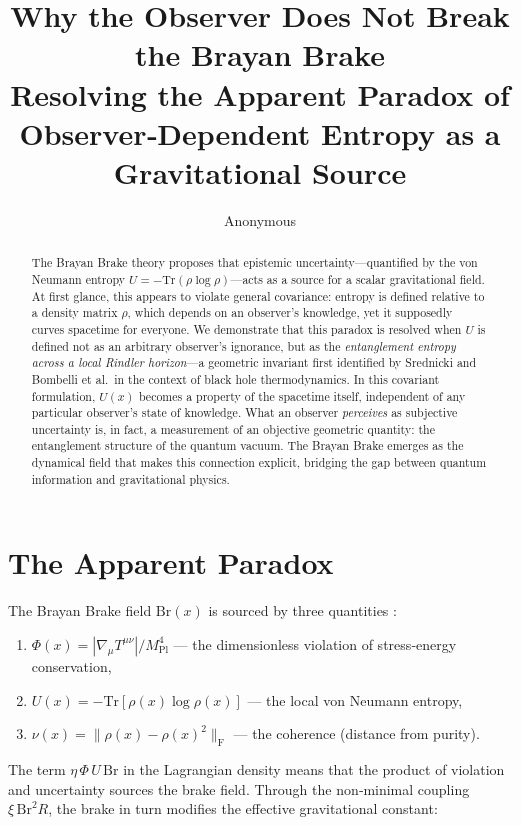 \documentclass[11pt]{article}
\title{\textbf{Why the Observer Does Not Break the Brayan Brake}\\[4pt]
\small Resolving the Apparent Paradox of Observer‑Dependent Entropy as a Gravitational Source}
\author{Anonymous}
\date{}
\begin{document}
\maketitle

\begin{abstract}
The Brayan Brake theory proposes that epistemic uncertainty—quantified by the von Neumann entropy \(U = -\mathrm{Tr}(\rho\log\rho)\)—acts as a source for a scalar gravitational field. At first glance, this appears to violate general covariance: entropy is defined relative to a density matrix \(\rho\), which depends on an observer's knowledge, yet it supposedly curves spacetime for everyone. We demonstrate that this paradox is resolved when \(U\) is defined not as an arbitrary observer's ignorance, but as the \emph{entanglement entropy across a local Rindler horizon}—a geometric invariant first identified by Srednicki and Bombelli et al.\ in the context of black hole thermodynamics. In this covariant formulation, \(U(x)\) becomes a property of the spacetime itself, independent of any particular observer's state of knowledge. What an observer \emph{perceives} as subjective uncertainty is, in fact, a measurement of an objective geometric quantity: the entanglement structure of the quantum vacuum. The Brayan Brake emerges as the dynamical field that makes this connection explicit, bridging the gap between quantum information and gravitational physics.
\end{abstract}

\section{The Apparent Paradox}
\label{sec:paradox}

The Brayan Brake field \(\mathrm{Br}(x)\) is sourced by three quantities \cite{brayan_brake_initial}:

\begin{enumerate}[leftmargin=2em]
    \item \(\Phi(x) = |\nabla_\mu T^{\mu\nu}| / M_{\text{Pl}}^4\) — the dimensionless violation of stress‑energy conservation,
    \item \(U(x) = -\mathrm{Tr}[\rho(x)\log\rho(x)]\) — the local von Neumann entropy,
    \item \(\nu(x) = \|\rho(x) - \rho(x)^2\|_{\mathrm{F}}\) — the coherence (distance from purity).
\end{enumerate}

The term \(\eta\,\Phi\,U\,\mathrm{Br}\) in the Lagrangian density means that the product of violation and uncertainty sources the brake field. Through the non‑minimal coupling \(\xi\,\mathrm{Br}^2 R\), the brake in turn modifies the effective gravitational constant:
\end{document}
